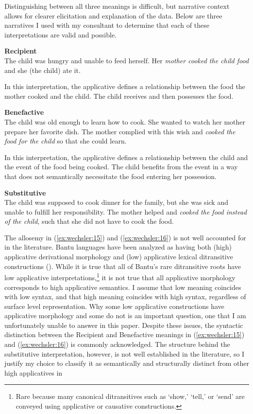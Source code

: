 \documentclass[output=paper,modfonts,nonflat]{langsci/langscibook}
\begin{document}
Distinguishing between all three meanings is difficult, but narrative context allows for clearer elicitation and explanation of the data. Below are three narratives I used with my consultant to determine that each of these interpretations are valid and possible. 


\ea\label{ex:wechsler:15}
\textbf{Recipient}\\
The child was hungry and unable to feed herself. Her \textit{mother cooked the child food} and she (the child) ate it.\\
\z

In this interpretation, the applicative defines a relationship between the food the mother cooked and the child. The child receives and then possesses the food. 


\ea\label{ex:wechsler:16}
\textbf{Benefactive}\\
The child was old enough to learn how to cook. She wanted to watch her mother prepare her favorite dish. The mother complied with this wish and \textit{cooked the food for the child} so that she could learn.\z

In this interpretation, the applicative defines a relationship between the child and the event of the food being cooked. The child benefits from the event in a way that does not semantically necessitate the food entering her possession. 


\ea\label{ex:wechsler:17}
\textbf{Substitutive}\\
The child was supposed to cook dinner for the family, but she was sick and unable to fulfill her responsibility. The mother helped and \textit{cooked the food instead of the child}, such that she did not have to cook the food.\\
\z

The allosemy in (\ref{ex:wechsler:15}) and (\ref{ex:wechsler:16}) is not well accounted for in the literature. Bantu languages have been analyzed as having both (high) applicative derivational morphology and (low) applicative lexical ditransitive constructions (\citealt{vanderWal2017}). While it is true that all of Bantu’s rare ditransitive roots have low applicative interpretations,\footnote{Rare because many canonical ditransitives such as ‘show,’ ‘tell,’ or ‘send’ are conveyed using applicative or causative constructions.}  it is not true that all applicative morphology corresponds to high applicative semantics. I assume that low meaning coincides with low syntax, and that high meaning coincides with high syntax, regardless of surface level representation. Why some low applicative constructions have applicative morphology and some do not is an important question, one that I am unfortunately unable to answer in this paper. Despite these issues, the syntactic distinction between the Recipient and Benefactive meanings in (\ref{ex:wechsler:15}) and (\ref{ex:wechsler:16}) is commonly acknowledged. The structure behind the substitutive interpretation, however, is not well established in the literature, so I justify my choice to classify it as semantically and structurally distinct from other high applicatives in  
\end{document}
